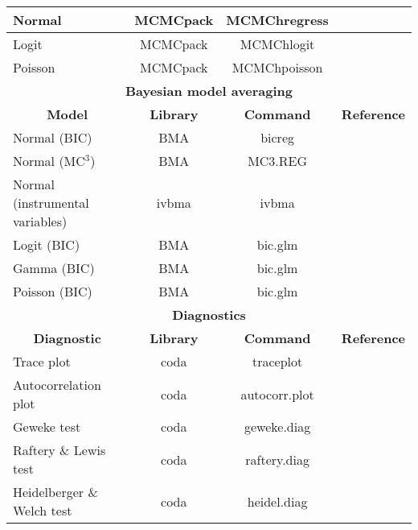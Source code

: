 \begin{table}[!ht]
\begin{center}
{{\begin{tabular}{|l|c|c|c|}
	\hline
	Normal & MCMCpack & MCMChregress & \cite{Martin2018} \\
	\hline
	Logit & MCMCpack & MCMChlogit & \cite{Martin2018} \\
	\hline
	Poisson & MCMCpack & MCMChpoisson & \cite{Martin2018} \\
	\hline
	\multicolumn{4}{|c|}{\textbf{Bayesian model averaging}} \\
	\hline  
	\multicolumn{1}{|c|}{\textbf{Model}} & \multicolumn{1}{c}{\textbf{Library}} & \multicolumn{1}{|c|}{\textbf{Command}} &
	\multicolumn{1}{|c|}{\textbf{Reference}} \\ 
	\hline
	Normal (BIC) & BMA & bicreg & \cite{Raftery2012} \\
	Normal (MC$^3$) & BMA & MC3.REG & \cite{Raftery2012} \\
	Normal (instrumental variables) & ivbma & ivbma & \cite{Lenkoski2013} \\
	Logit (BIC) & BMA & bic.glm & \cite{Raftery2012} \\
	Gamma (BIC) & BMA & bic.glm & \cite{Raftery2012} \\
	Poisson (BIC) & BMA & bic.glm & \cite{Raftery2012} \\
	\hline
	\multicolumn{4}{|c|}{\textbf{Diagnostics}} \\
	\hline  
	\multicolumn{1}{|c|}{\textbf{Diagnostic}} & \multicolumn{1}{c}{\textbf{Library}} & \multicolumn{1}{|c|}{\textbf{Command}} &
	\multicolumn{1}{|c|}{\textbf{Reference}} \\ 
	\hline
	Trace plot & coda & traceplot & \cite{Plummer2016} \\
	Autocorrelation plot & coda & autocorr.plot & \cite{Plummer2016} \\
	Geweke test & coda & geweke.diag & \cite{Plummer2016} \\
	Raftery \& Lewis test & coda & raftery.diag & \cite{Plummer2016} \\
	Heidelberger \& Welch test & coda & heidel.diag & \cite{Plummer2016} \\
	\hline
	\end{tabular}
}}
\end{center}
\end{table}